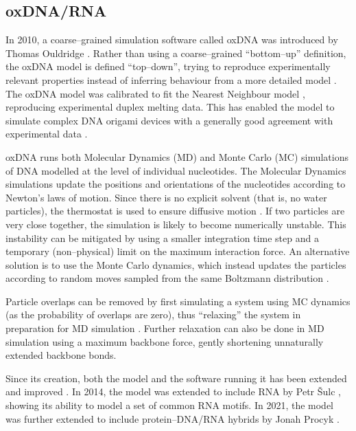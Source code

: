 \subsection{oxDNA/RNA}
\label{sec:oxDNA}

In 2010, a coarse--grained simulation software called oxDNA was introduced by Thomas Ouldridge \cite{ouldridge2010dna}. Rather than using a coarse--grained ``bottom--up'' definition, the oxDNA model is defined ``top--down'', trying to reproduce experimentally relevant properties instead of inferring behaviour from a more detailed model \cite{sengar2021primer}. The oxDNA model was calibrated to fit the Nearest Neighbour model \cite{santalucia1998unified}, reproducing experimental duplex melting data. This has enabled the model to simulate complex DNA origami devices with a generally good agreement with experimental data \cite{sharma2017characterizing}.

oxDNA runs both Molecular Dynamics (MD) and Monte Carlo (MC) simulations of DNA modelled at the level of individual nucleotides. The Molecular Dynamics simulations update the positions and orientations of the nucleotides according to Newton's laws of motion. Since there is no explicit solvent (that is, no water particles), the thermostat is used to ensure diffusive motion \cite{sengar2021primer}. If two particles are very close together, the simulation is likely to become numerically unstable. This instability can be mitigated by using a smaller integration time step and a temporary (non--physical) limit on the maximum interaction force. An alternative solution is to use the Monte Carlo dynamics, which instead updates the particles according to random moves sampled from the same Boltzmann distribution \cite{sengar2021primer}.

Particle overlaps can be removed by first simulating a system using MC dynamics (as the probability of overlaps are zero), thus ``relaxing'' the system in preparation for MD simulation \cite{doye2020oxdna}. Further relaxation can also be done in MD simulation using a maximum backbone force, gently shortening unnaturally extended backbone bonds. 

Since its creation, both the model and the software running it has been extended and improved \cite{ouldridge2011structural, rovigatti2015comparison, sulc2012Sequence, ouldridge2013optimizing, snodin2015introducing}. In 2014, the model was extended to include RNA by Petr {\v{S}}ulc \cite{vsulc2014nucleotide}, showing its ability to model a set of common RNA motifs. In 2021, the model was further extended to include protein--DNA/RNA hybrids by Jonah Procyk \cite{procyk2021coarse}.


